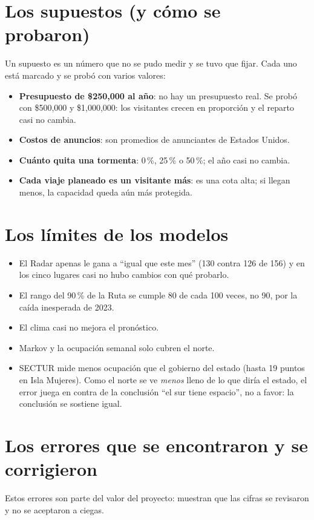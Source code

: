 \section{Los supuestos (y cómo se probaron)}
Un supuesto es un número que no se pudo medir y se tuvo que fijar. Cada uno está marcado y se probó con varios valores:
\begin{itemize}
\item \textbf{Presupuesto de \$250,000 al año}: no hay un presupuesto real. Se probó con \$500,000 y \$1,000,000: los
  visitantes crecen en proporción y el reparto casi no cambia.
\item \textbf{Costos de anuncios}: son promedios de anunciantes de Estados Unidos.
\item \textbf{Cuánto quita una tormenta}: 0\,\%, 25\,\% o 50\,\%; el año casi no cambia.
\item \textbf{Cada viaje planeado es un visitante más}: es una cota alta; si llegan menos, la capacidad queda aún más
  protegida.
\end{itemize}

\section{Los límites de los modelos}
\begin{itemize}
\item El Radar apenas le gana a ``igual que este mes'' (130 contra 126 de 156) y en los cinco lugares casi no hubo cambios
  con qué probarlo.
\item El rango del 90\,\% de la Ruta se cumple 80 de cada 100 veces, no 90, por la caída inesperada de 2023.
\item El clima casi no mejora el pronóstico.
\item Markov y la ocupación semanal solo cubren el norte.
\item SECTUR mide menos ocupación que el gobierno del estado (hasta 19 puntos en Isla Mujeres). Como el norte se ve
  \emph{menos} lleno de lo que diría el estado, el error juega en contra de la conclusión ``el sur tiene espacio'', no a
  favor: la conclusión se sostiene igual.
\end{itemize}

\section{Los errores que se encontraron y se corrigieron}
Estos errores son parte del valor del proyecto: muestran que las cifras se revisaron y no se aceptaron a ciegas.

